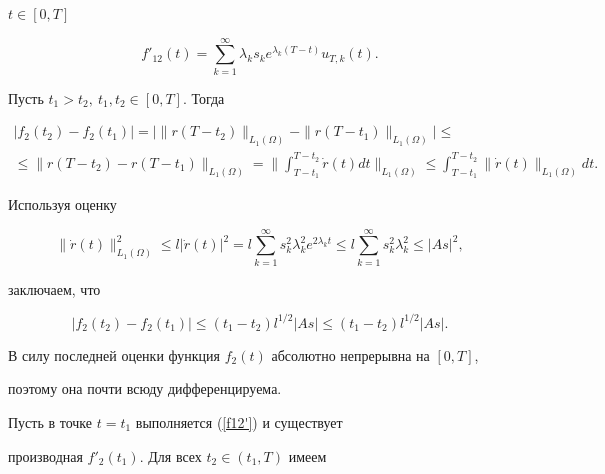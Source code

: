 \begin{pf}
$t\in[0,T]$


\begin{equation} \label{f12'}


f'_{12}(t)=\sum_{k=1}^\infty\lambda_k s_k e^{\lambda_k{(T-t)}}u_{T,k}(t).


\end{equation}





Пусть $t_1>t_2,\ t_1,t_2\in[0,T]$. Тогда 


\begin{multline*}


|f_2(t_2)-f_2(t_1)|=\big|\|r(T-t_2) \|_{L_1(\Omega)}-


\|r(T-t_1) \|_{L_1(\Omega)} \big|\le \\


%


\le\|r(T-t_2)-r(T-t_1) \|_{L_1(\Omega)}


=\bigg\|\int_{T-t_1}^{T-t_2}\Dot r(t)dt\bigg \|_{L_1(\Omega)} \le


\int_{T-t_1}^{T-t_2}\|\Dot r(t) \|_{L_1(\Omega)}  dt.


\end{multline*}





Используя оценку


$$


\|\Dot r(t)\|_{L_1(\Omega)}^2 \le


l |\Dot r(t)|^2 =l\sum_{k=1}^\infty s_k^2\lambda_k^2e^{2\lambda_k t}\le


l \sum_{k=1}^\infty  s_k^2\lambda_k^2\le|As|^2,


$$


заключаем, что


$$


|f_2(t_2)-f_2(t_1)| \le (t_1-t_2) l^{1/2}|As| \le (t_1-t_2)l^{1/2}|As|.


$$


В силу последней оценки функция $f_2(t)$ абсолютно непрерывна на $[0,T]$, 


поэтому она почти всюду дифференцируема. 





Пусть в точке $t=t_1$ выполняется (\ref{f12'}) и существует 


производная $f'_2(t_1)$. Для всех $t_2\in(t_1,T)$ имеем


\begin{multline*}



\end{multline*}
\end{pf}
